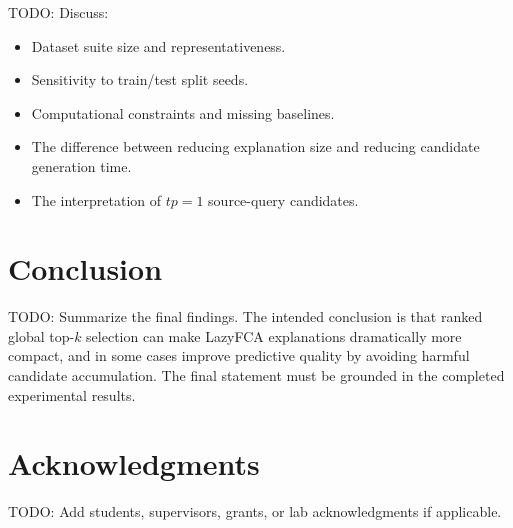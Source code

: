 \documentclass[11pt]{article}
\begin{document}
TODO: Discuss:

\begin{itemize}[leftmargin=*]
    \item Dataset suite size and representativeness.
    \item Sensitivity to train/test split seeds.
    \item Computational constraints and missing baselines.
    \item The difference between reducing explanation size and reducing
    candidate generation time.
    \item The interpretation of $tp=1$ source-query candidates.
\end{itemize}

\section{Conclusion}

TODO: Summarize the final findings. The intended conclusion is that ranked
global top-$k$ selection can make LazyFCA explanations dramatically more
compact, and in some cases improve predictive quality by avoiding harmful
candidate accumulation. The final statement must be grounded in the completed
experimental results.

\section*{Acknowledgments}

TODO: Add students, supervisors, grants, or lab acknowledgments if applicable.



\end{document}
